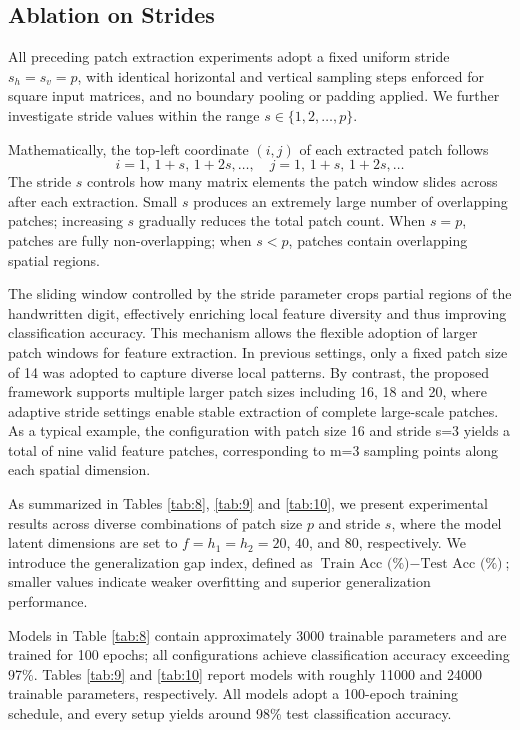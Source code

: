 \documentclass[pdflatex,sn-mathphys-num]{sn-jnl}%
\theoremstyle{thmstyleone}%
\theoremstyle{thmstyletwo}%
\theoremstyle{thmstylethree}%
\begin{document}
\subsection{Ablation on Strides}
All preceding patch extraction experiments adopt a fixed uniform stride $s_h = s_v = p$, with identical horizontal and vertical sampling steps enforced for square input matrices, and no boundary pooling or padding applied. We further investigate stride values within the range $s \in \{1,2,\dots,p\}$.

Mathematically, the top-left coordinate $(i,j)$ of each extracted patch follows
\[
i = 1,\,1+s,\,1+2s,\dots,\quad j = 1,\,1+s,\,1+2s,\dots
\]
The stride $s$ controls how many matrix elements the patch window slides across after each extraction. Small $s$ produces an extremely large number of overlapping patches; increasing $s$ gradually reduces the total patch count. When $s=p$, patches are fully non-overlapping; when $s<p$, patches contain overlapping spatial regions.

The sliding window controlled by the stride parameter crops partial regions of the handwritten digit, effectively enriching local feature diversity and thus improving classification accuracy. This mechanism allows the flexible adoption of larger patch windows for feature extraction. In previous settings, only a fixed patch size of 14 was adopted to capture diverse local patterns. By contrast, the proposed framework supports multiple larger patch sizes including 16, 18 and 20, where adaptive stride settings enable stable extraction of complete large-scale patches. As a typical example, the configuration with patch size 16 and stride s=3 yields a total of nine valid feature patches, corresponding to m=3 sampling points along each spatial dimension.

As summarized in Tables \ref{tab:8}, \ref{tab:9} and \ref{tab:10}, we present experimental results across diverse combinations of patch size $p$ and stride $s$, where the model latent dimensions are set to $f=h_1=h_2=20$, $40$, and $80$, respectively. We introduce the generalization gap index, defined as $\text{Train Acc (\%)} - \text{Test Acc (\%)}$; smaller values indicate weaker overfitting and superior generalization performance.

Models in Table \ref{tab:8} contain approximately 3000 trainable parameters and are trained for 100 epochs; all configurations achieve classification accuracy exceeding 97\%. Tables \ref{tab:9} and \ref{tab:10} report models with roughly 11000 and 24000 trainable parameters, respectively. All models adopt a 100-epoch training schedule, and every setup yields around 98\% test classification accuracy.
\end{document}
